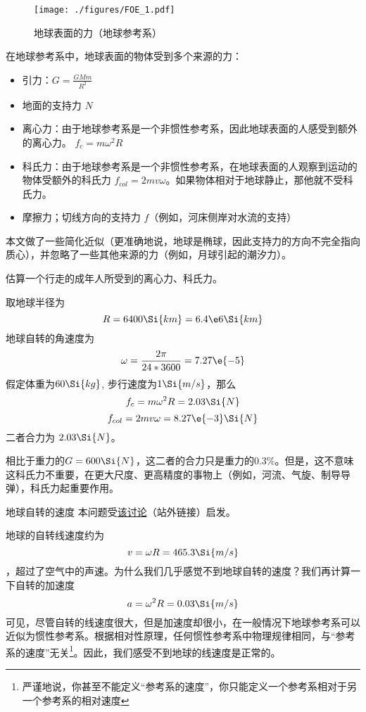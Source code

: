 
\begin{issues}
\issueDraft
{}
\end{issues}

\begin{figure}[ht]
\centering
\texttt{[image: ./figures/FOE\_1.pdf]}
\caption{地球表面的力（地球参考系）} \label{FOE_fig1}
\end{figure}

在地球参考系中，地球表面的物体受到多个来源的力：
\begin{itemize}
\item 引力：$G=\frac{GMm}{R^2}$
\item 地面的支持力 $N$
\item 离心力：由于地球参考系是一个非惯性参考系，因此地球表面的人感受到额外的离心力。 $f_c = m \omega^2 R$
\item 科氏力：由于地球参考系是一个非惯性参考系，在地球表面的人观察到运动的物体受额外的科氏力 $f_{col} = 2 m v \omega$。如果物体相对于地球静止，那他就不受科氏力。
\item 摩擦力；切线方向的支持力 $f$（例如，河床侧岸对水流的支持）
\end{itemize}

本文做了一些简化近似（更准确地说，地球是椭球，因此支持力的方向不完全指向质心），并忽略了一些其他来源的力（例如，月球引起的潮汐力）。

\begin{example}{}
估算一个行走的成年人所受到的离心力、科氏力。

取地球半径为
$$R=6400\Si{km}=6.4\e6 \Si{km}$$
地球自转的角速度为
$$\omega = \frac{2\pi}{24*3600}=7.27\e{-5}$$
假定体重为$60 \Si{kg}$, 步行速度为$1 \Si{m/s}$，那么
$$
f_c = m \omega^2 R = 2.03 \Si{N}
$$
$$
f_{col} = 2 m v\omega = 8.27\e{-3} \Si{N}
$$
二者合力为 $2.03 \Si{N}$。

相比于重力的$G=600 \Si{N}$，这二者的合力只是重力的$0.3\%$。但是，这不意味这科氏力不重要，在更大尺度、更高精度的事物上（例如，河流、气旋、制导导弹），科氏力起重要作用。
\end{example}

\begin{example}{地球自转的速度}
本问题受\href{https://www.zhihu.com/question/579214803}{该讨论}（站外链接）启发。

地球的自转线速度约为 $$v=\omega R = 465.3 \Si{m/s}$$，超过了空气中的声速。为什么我们几乎感觉不到地球自转的速度？我们再计算一下自转的加速度
$$a=\omega^2 R= 0.03 \Si{m/s}$$
可见，尽管自转的线速度很大，但是加速度却很小，在一般情况下地球参考系可以近似为惯性参考系。根据相对性原理，任何惯性参考系中物理规律相同，与“参考系的速度”无关\footnote{严谨地说，你甚至不能定义“参考系的速度”，你只能定义一个参考系相对于另一个参考系的相对速度}。因此，我们感受不到地球的线速度是正常的。
\end{example}
